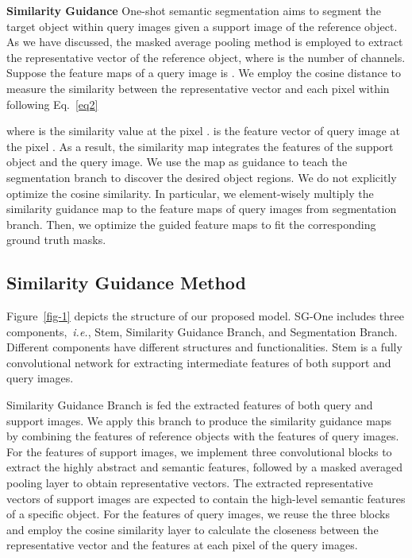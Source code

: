 \documentclass[journal]{IEEEtran}
\newcommand{\ie}{\emph{i.e.}}
\begin{document}
\noindent \textbf{Similarity Guidance}
One-shot semantic segmentation aims to segment the target object within query images given a support image of the reference object.
As we have discussed, the masked average pooling method is employed to extract the representative vector  of the reference object, where  is the number of channels.
Suppose the feature maps of a query image  is .
We employ the cosine distance to measure the similarity between the representative vector  and each pixel within  following Eq.~\eqref{eq2}

where  is the similarity value at the pixel .
 is the feature vector of query image at the pixel .
As a result, the similarity map  integrates the features of the support object and the query image.
We use the map  as guidance to teach the segmentation branch to discover the desired object regions.
We do not explicitly optimize the cosine similarity. 
In particular, we element-wisely multiply the similarity guidance map to the feature maps of query images from segmentation branch.
Then, we optimize the guided feature maps to fit the corresponding ground truth masks.

\subsection{Similarity Guidance Method}

Figure~\ref{fig-1} depicts the structure of our proposed model.
SG-One includes three components,~\ie, Stem, Similarity Guidance Branch, and Segmentation Branch.
Different components have different structures and functionalities.
Stem is a fully convolutional network for extracting intermediate features of both support and query images. 

Similarity Guidance Branch is fed the extracted features of both query and support images.
We apply this branch to produce the similarity guidance maps by combining the features of reference objects with the features of query images.
For the features of support images, we implement three convolutional blocks to extract the highly abstract and semantic features, followed by a masked averaged pooling layer to obtain representative vectors.
The extracted representative vectors of support images are expected to contain the high-level semantic features of a specific object. 
For the features of query images, we reuse the three blocks and employ the cosine similarity layer to calculate the closeness between the representative vector and the features at each pixel of the query images.  
\end{document}
